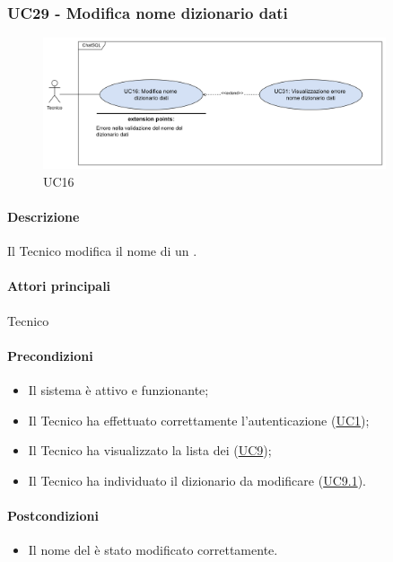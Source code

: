 \subsubsection{UC29 - Modifica nome dizionario dati}\label{UC29}

\begin{figure}[H]
  \centering
  \includegraphics[width=0.90\textwidth]{assets/uc16.png}
  \caption{UC16}
\end{figure}

\paragraph*{Descrizione}
Il Tecnico modifica il nome di un .

\paragraph*{Attori principali}
Tecnico

\paragraph*{Precondizioni}
\begin{itemize}
  \item Il sistema è attivo e funzionante;
  \item Il Tecnico ha effettuato correttamente l'autenticazione (\hyperref[UC1]{UC1});
  \item Il Tecnico ha visualizzato la lista dei  (\hyperref[UC9]{UC9});
  \item Il Tecnico ha individuato il dizionario da modificare (\hyperref[UC9.1]{UC9.1}).
\end{itemize}

\paragraph*{Postcondizioni}
\begin{itemize}
  \item Il nome del  è stato modificato correttamente.
\end{itemize}

